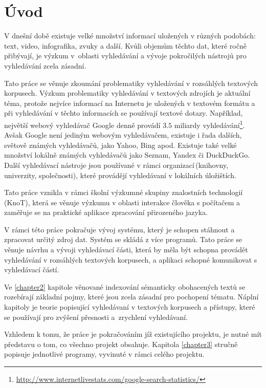 \chapter{Úvod}
V dnešní době existuje velké množství informací uložených v různých podobách: text, video, infografika, zvuky a další. Kvůli objemům těchto dat, které ročně přibývají, je výzkum v~oblasti vyhledávání a vývoje pokročilých nástrojů pro vyhledávání zcela zásadní. 

Tato práce se věnuje zkoumání problematiky vyhledávání v rozsáhlých textových korpusech. Výzkum problematiky vyhledávání v textových zdrojích je aktuální téma, protože nejvíce informací na Internetu je uložených v textovém formátu a při vyhledávání v těchto informacích se používají textové dotazy. Například, největší webový vyhledávač Google denně provádí $3.5$ miliardy vyhledávání\footnote{\href{http://www.internetlivestats.com/google-search-statistics/}{http://www.internetlivestats.com/google-search-statistics/}}. Avšak Google není jediným webovým vyhledávačem, existuje i řada dalších, světově známých vyhledávačů, jako Yahoo, Bing apod.  Existuje také velké množství lokálně známých vyhledávačů jako Seznam, Yandex či DuckDuckGo. Další vyhledávací nástroje jsou používané v rámci organizací\,(knihovny, univerzity, společnosti), které provádějí vyhledávaní v lokálních úložištích.

Tato práce vznikla v rámci školní výzkumné skupiny znalostních technologií\,(KnoT), která se věnuje výzkumu v oblasti interakce člověka s počítačem a zaměřuje se na praktické aplikace zpracování přirozeného jazyka.

V rámci této práce pokračuje vývoj systému, který je schopen stáhnout a zpracovat určitý zdroj dat. Systém se skládá z více programů. Tato práce se věnuje návrhu a vývoji vyhledávací části, která by měla být schopna provádět vyhledávání v rozsáhlých textových korpusech, a aplikaci schopné komunikovat s vyhledávací částí.

Ve \ref{chapter2} kapitole věnované indexování sémanticky obohacených textů se rozebírají základní pojmy, které jsou zcela zásadní pro pochopení tématu. Náplní kapitoly je teorie popisující vyhledávaní v textových korpusech a přístupy, které se používají pro zvýšení přesnosti a~zrychlení vyhledávaní. 

Vzhledem k tomu, že práce je pokračováním jíž existujícího projektu, je nutné mít představu o tom, co všechno projekt obsahuje.  Kapitola \ref{chapter3}  stručně popisuje jednotlivé programy, vyvinuté v rámci celého projektu.

